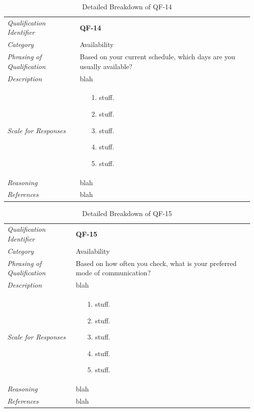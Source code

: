 \documentclass[12pt,letterpaper]{article}
\begin{document}
\begin{table}[H]
	\caption{Detailed Breakdown of QF-14}
	\begin{tabu} to 
		\toprule
		Qualification Identifier & {\bf QF-14}\\
		Category & Availability \\
		Phrasing of Qualification & Based on your current schedule, which days are you usually available? \\
		Description & blah\\
		Scale for Responses &
		\begin{minipage}[t]{\linewidth}
			\begin{enumerate}
				\item[1.] stuff.
				\item[2.] stuff.
				\item[3.] stuff.
				\item[4.] stuff.
				\item[5.] stuff.
			\end{enumerate}
		\end{minipage}\\
		Reasoning & blah\\
		References & blah\\
		\toprule
	\end{tabu}
\end{table}

\begin{table}[H]
	\caption{Detailed Breakdown of QF-15}
	\begin{tabu} to 
		\toprule
		Qualification Identifier & {\bf QF-15}\\
		Category & Availability \\
		Phrasing of Qualification & Based on how often you check, what is your preferred mode of communication? \\
		Description & blah\\
		Scale for Responses &
		\begin{minipage}[t]{\linewidth}
			\begin{enumerate}
				\item[1.] stuff.
				\item[2.] stuff.
				\item[3.] stuff.
				\item[4.] stuff.
				\item[5.] stuff.
			\end{enumerate}
		\end{minipage}\\
		Reasoning & blah\\
		References & blah\\
		\toprule
	\end{tabu}
\end{table}
\end{document}
